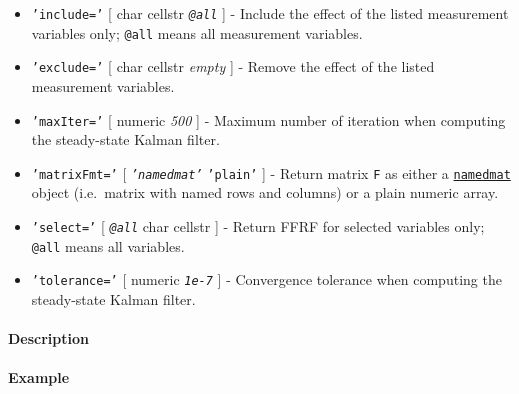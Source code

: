 \begin{itemize}
\item
  \texttt{'include='} {[} char \textbar{} cellstr \textbar{}
  \emph{\texttt{@all}} {]} - Include the effect of the listed
  measurement variables only; \texttt{@all} means all measurement
  variables.
\item
  \texttt{'exclude='} {[} char \textbar{} cellstr \textbar{}
  \emph{empty} {]} - Remove the effect of the listed measurement
  variables.
\item
  \texttt{'maxIter='} {[} numeric \textbar{} \emph{500} {]} - Maximum
  number of iteration when computing the steady-state Kalman filter.
\item
  \texttt{'matrixFmt='} {[} \emph{\texttt{'namedmat'}} \textbar{}
  \texttt{'plain'} {]} - Return matrix \texttt{F} as either a
  \href{namedmat/Contents}{\texttt{namedmat}} object (i.e.~matrix with
  named rows and columns) or a plain numeric array.
\item
  \texttt{'select='} {[} \emph{\texttt{@all}} \textbar{} char \textbar{}
  cellstr {]} - Return FFRF for selected variables only; \texttt{@all}
  means all variables.
\item
  \texttt{'tolerance='} {[} numeric \textbar{} \emph{\texttt{1e-7}} {]}
  - Convergence tolerance when computing the steady-state Kalman filter.
\end{itemize}

\paragraph{Description}

\paragraph{Example}


